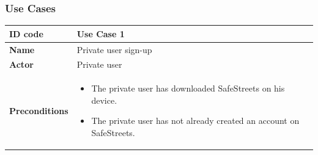 \documentclass[titlepage]{article}
\begin{document}
\subsubsection{Use Cases}

\begin{longtable}{| p{3 cm} | p{10 cm} |} 
\hline



\textbf{ID code}   & Use Case 1\\ \hline
\textbf{Name}	& Private user sign-up \\ \hline
\textbf{Actor}     & Private user	 \\ \hline
\textbf{Preconditions} & 
\begin{itemize}
	\item The private user has downloaded SafeStreets on his device. 
	\item The private user has not already created an account on SafeStreets.
\end{itemize} 
     \\ \hline
     

\end{longtable}
\end{document}
